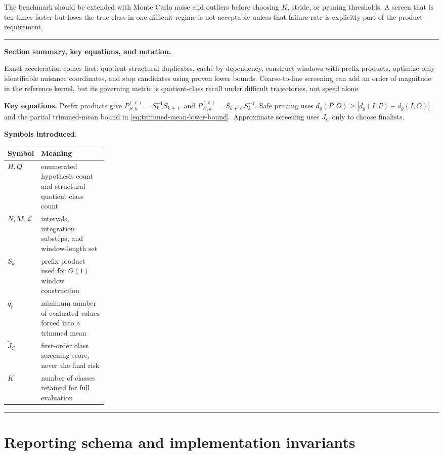 \documentclass[11pt]{article}
\newenvironment{sectionrecap}
{\par\medskip\begingroup\small\noindent\rule{\linewidth}{0.4pt}\par
\smallskip\noindent\textbf{Section summary, key equations, and notation.}\par\smallskip}
{\par\smallskip\noindent\rule{\linewidth}{0.4pt}\par\endgroup\medskip}
\begin{document}
    The benchmark should be extended with Monte Carlo noise and outliers before choosing
    $K$, stride, or pruning thresholds. A screen that is ten times faster but loses the true
    class in one difficult regime is not acceptable unless that failure rate is explicitly
    part of the product requirement.

    \begin{sectionrecap}
        Exact acceleration comes first: quotient structural duplicates, cache by dependency,
        construct windows with prefix products, optimize only identifiable nuisance coordinates,
        and stop candidates using proven lower bounds. Coarse-to-fine screening can add an order
        of magnitude in the reference kernel, but its governing metric is quotient-class recall
        under difficult trajectories, not speed alone.

        \noindent\textbf{Key equations.}
        Prefix products give $P_{B,k}^{(\ell)}=S_k^{-1}S_{k+\ell}$ and
        $P_{W,k}^{(\ell)}=S_{k+\ell}S_k^{-1}$. Safe pruning uses
        $d_g(P,O)\ge|d_g(I,P)-d_g(I,O)|$ and the partial trimmed-mean bound in
        \eqref{eq:trimmed-mean-lower-bound}. Approximate screening uses
        $\widetilde J_C$ only to choose finalists.

        \noindent\textbf{Symbols introduced.}
        \par\noindent\begin{tabularx}{\linewidth}{@{}p{0.23\linewidth}Y@{}}
\toprule
Symbol & Meaning \\
\midrule
$H,Q$ & enumerated hypothesis count and structural quotient-class count \\
$N,M,\mathcal L$ & intervals, integration substeps, and window-length set \\
$S_k$ & prefix product used for $O(1)$ window construction \\
$q_r$ & minimum number of evaluated values forced into a trimmed mean \\
$\widetilde J_C$ & first-order class screening score, never the final risk \\
$K$ & number of classes retained for full evaluation \\
\bottomrule
        \end{tabularx}
    \end{sectionrecap}


    \section{Reporting schema and implementation invariants}\label{app:report}
\end{document}
